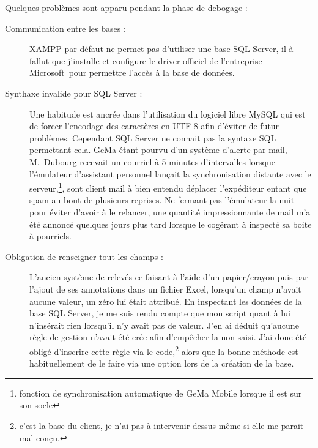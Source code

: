 Quelques problèmes sont apparu pendant la phase de debogage :
\begin{description}

  \item[Communication entre les bases :] XAMPP par défaut ne permet pas
    d'utiliser une base SQL Server, il à fallut que j'installe et
    configure le driver officiel de l'entreprise
    Microsoft~\textregistered pour permettre l'accès à la base de
    données.

  \item[Synthaxe invalide pour SQL Server :] Une habitude est ancrée
    dans l'utilisation du logiciel libre MySQL qui est de forcer
    l'encodage des caractères en UTF-8 afin d'éviter de futur problèmes.
    Cependant SQL Server ne connait pas la syntaxe SQL permettant cela.
    GeMa étant pourvu d'un système d'alerte par mail, M.~Dubourg
    recevait un courriel à 5 minutes d'intervalles lorsque l'émulateur
    d'assistant personnel lançait la synchronisation distante avec le
    serveur,\footnote{fonction de synchronisation automatique de GeMa
    Mobile lorsque il est sur son socle}, sont client mail à bien
    entendu déplacer l'expéditeur entant que spam au bout de plusieurs
    reprises. Ne fermant pas l'émulateur la nuit pour éviter d'avoir à
    le relancer, une quantité impressionnante de mail m'a été annoncé
    quelques jours plus tard lorsque le cogérant à inspecté sa boite à
    pourriels.

  \item[Obligation de renseigner tout les champs :] L'ancien système de
    relevés ce faisant à l'aide d'un papier/crayon puis par l'ajout de
    ses annotations dans un fichier Excel, lorsqu'un champ n'avait
    aucune valeur, un zéro lui était attribué. En inspectant les données
    de la base SQL Server, je me suis rendu compte que mon script quant
    à lui n'insérait rien lorsqu'il n'y avait pas de valeur. J'en ai
    déduit qu'aucune règle de gestion n'avait été crée afin d'empêcher
    la non-saisi. J'ai donc été obligé d'inscrire cette règle via le
    code,\footnote{c'est la base du client, je n'ai pas à intervenir
    dessus même si elle me parait mal conçu.} alors que la bonne méthode
    est habituellement de le faire via une option lors de la création de
    la base.

\end{description}
